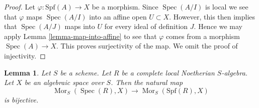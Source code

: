 \documentclass{stacks-project}
\theoremstyle{plain}
\newtheorem{lemma}[subsection]{Lemma}
\theoremstyle{definition}
\theoremstyle{remark}
\numberwithin{equation}{subsection}
\def\Spec{\mathop{\mathrm{Spec}}}
\def\Mor{\mathop{\mathrm{Mor}}\nolimits}
\begin{document}
\begin{proof}
Let $\varphi : \text{Spf}(A) \to X$ be a morphism. Since $\Spec(A/I)$
is local we see that $\varphi$ maps $\Spec(A/I)$ into an affine
open $U \subset X$. However, this then implies that $\Spec(A/J)$
maps into $U$ for every ideal of definition $J$. Hence we may
apply Lemma \ref{lemma-map-into-affine} to see that $\varphi$ comes
from a morphism $\Spec(A) \to X$. This proves surjectivity of the map.
We omit the proof of injectivity.
\end{proof}

\begin{lemma}
\label{lemma-map-into-algebraic-space}
Let $S$ be a scheme. Let $R$ be a complete local Noetherian $S$-algebra.
Let $X$ be an algebraic space over $S$. Then the natural map
$$
\Mor_S(\Spec(R), X)
\longrightarrow
\Mor_S(\text{Spf}(R), X)
$$
is bijective.
\end{lemma}
\end{document}
